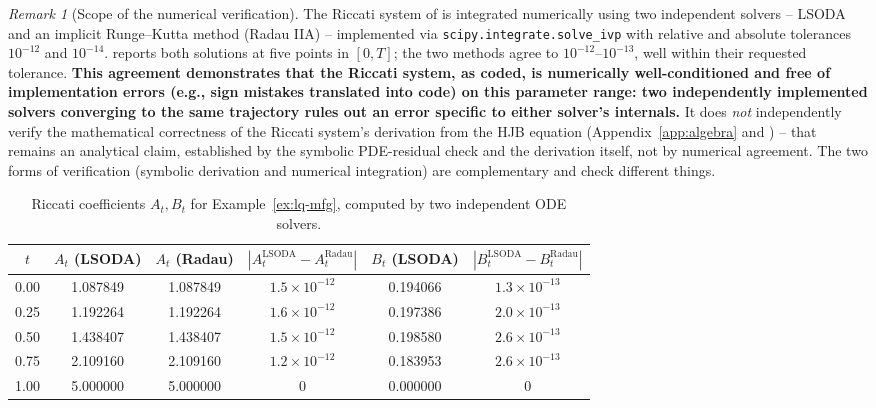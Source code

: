 \documentclass[11pt]{article}
\theoremstyle{remark}
\newtheorem{remark}[theorem]{Remark}
\begin{document}
\begin{remark}[Scope of the numerical verification]
\label{rem:numerical-verification}
The Riccati system of  is integrated numerically using two
independent solvers -- LSODA
and an implicit Runge--Kutta method (Radau IIA) -- implemented via
\texttt{scipy.integrate.solve\_ivp} with relative and absolute tolerances
$10^{-12}$ and $10^{-14}$.  reports both solutions
at five points in $[0,T]$; the two methods agree to $10^{-12}$--$10^{-13}$, well
within their requested tolerance. \textbf{This agreement demonstrates that the
Riccati system, as coded, is numerically well-conditioned and free of implementation
errors (e.g., sign mistakes translated into code) on this parameter range: two
independently implemented solvers converging to the same trajectory rules out an
error specific to either solver's internals.} It does \emph{not} independently
verify the mathematical correctness of the Riccati system's derivation from the
HJB equation (Appendix~\ref{app:algebra} and \citealp[Appendix A]{monyimba2026thesis}) --
that remains an analytical claim, established by the symbolic PDE-residual
check and the derivation itself, not by numerical agreement. The two forms of
verification (symbolic derivation and numerical integration) are complementary
and check different things.
\end{remark}

\begin{table}[ht]
\centering
\caption{Riccati coefficients $A_t, B_t$ for Example~\ref{ex:lq-mfg}, computed by
two independent ODE solvers.}
\label{tab:riccati-verification}
\begin{tabular}{cccccc}
\toprule
$t$ & $A_t$ (LSODA) & $A_t$ (Radau) & $|A_t^{\mathrm{LSODA}}-A_t^{\mathrm{Radau}}|$
    & $B_t$ (LSODA) & $|B_t^{\mathrm{LSODA}}-B_t^{\mathrm{Radau}}|$ \\
\midrule
0.00 & 1.087849 & 1.087849 & $1.5\times 10^{-12}$ & 0.194066 & $1.3\times 10^{-13}$ \\
0.25 & 1.192264 & 1.192264 & $1.6\times 10^{-12}$ & 0.197386 & $2.0\times 10^{-13}$ \\
0.50 & 1.438407 & 1.438407 & $1.5\times 10^{-12}$ & 0.198580 & $2.6\times 10^{-13}$ \\
0.75 & 2.109160 & 2.109160 & $1.2\times 10^{-12}$ & 0.183953 & $2.6\times 10^{-13}$ \\
1.00 & 5.000000 & 5.000000 & $0$ & 0.000000 & $0$ \\
\bottomrule
\end{tabular}
\end{table}
\end{document}
